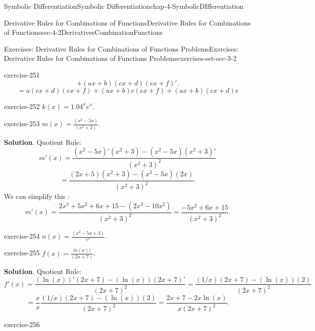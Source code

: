 \documentclass[oneside,10pt,]{book}
\numberwithin{equation}{section}
\begin{document}
\begin{chapterptx}{Symbolic Differentiation}{}{Symbolic Differentiation}{}{}{chap-4-SymbolicDIfferentiation}
\begin{sectionptx}{Derivative Rules for Combinations of Functions}{}{Derivative Rules for Combinations of Functions}{}{}{sec-4-2DerivativesCombinationFunctions}
\begin{exercises-subsection}{Exercises: Derivative Rules for Combinations of Functions Problems}{}{Exercises: Derivative Rules for Combinations of Functions Problems}{}{}{exercises-set-sec-3-2}
\begin{divisionexercise}{9}{}{}{exercise-251}
\begin{equation*}
\end{equation*}
%
\begin{equation*}
+(a x+b)(c x+d) (e x+f)'.
\end{equation*}
%
\begin{equation*}
=a(c x+d)(e x+f)+(a x+b)c (e x+f)+(a x+b)(c x+d)e
\end{equation*}
\end{divisionexercise}%
\begin{divisionexercise}{10}{}{}{exercise-252}%
\hypertarget{p-1583}{}%
\(k(x)=1.04^x e^x\).%
\end{divisionexercise}%
\begin{divisionexercise}{11}{}{}{exercise-253}%
\hypertarget{p-1584}{}%
\(m(x)=\frac{(x^2-5x)}{(x^2+3)}\).%
\par\smallskip%
\noindent\textbf{Solution}.\hypertarget{solution-126}{}\quad%
\hypertarget{p-1585}{}%
Quotient Rule:%
%
\begin{equation*}
m'(x)=\frac{(x^2-5x)' (x^2+3)-(x^2-5x) (x^2+3)'}{(x^2+3)^2}
\end{equation*}
%
\begin{equation*}
=\frac{(2x+5)(x^2+3)-(x^2-5x)(2x)}{(x^2+3)^2}.
\end{equation*}
\hypertarget{p-1586}{}%
We can simplify this :%
%
\begin{equation*}
m'(x)=\frac{2x^3+5x^2+6x+15-(2x^3-10x^2 )}{(x^2+3)^2} =\frac{-5x^2+6x+15}{(x^2+3)^2}.
\end{equation*}
\end{divisionexercise}%
\begin{divisionexercise}{12}{}{}{exercise-254}%
\hypertarget{p-1587}{}%
\(n(x)=\frac{(x^2-5x+3)}{e^x}\).%
\end{divisionexercise}%
\begin{divisionexercise}{13}{}{}{exercise-255}%
\hypertarget{p-1588}{}%
\(f(x)=\frac{ln(x))}{(2x+7)}\).%
\par\smallskip%
\noindent\textbf{Solution}.\hypertarget{solution-127}{}\quad%
\hypertarget{p-1589}{}%
Quotient Rule:%
%
\begin{equation*}
f'(x)=\frac{(\ln(x))'(2x+7)-(\ln(x))(2x+7)'}{(2x+7)^2}
=\frac{(1/x)(2x+7)-(\ln(x))(2)}{(2x+7)^2}
\end{equation*}
%
\begin{equation*}
=\frac{x}{x}\frac{ (1/x)(2x+7)-(\ln(x))(2)}{(2x+7)^2} 
= \frac{2x+7-2x \ln(x)}{x (2x+7)^2}.
\end{equation*}
\end{divisionexercise}%
\begin{divisionexercise}{14}{}{}{exercise-256}%

\end{divisionexercise}
\end{exercises-subsection}
\end{sectionptx}
\end{chapterptx}
\end{document}
